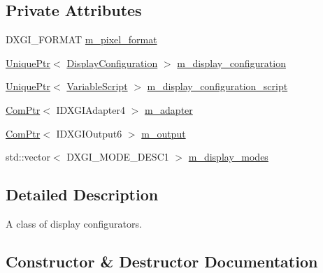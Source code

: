 \subsection*{Private Attributes}
\begin{DoxyCompactItemize}
\item 
D\+X\+G\+I\+\_\+\+F\+O\+R\+M\+AT \hyperlink{classmage_1_1_display_configurator_a22998ef4e54c3da0118a734164792b8f}{m\+\_\+pixel\+\_\+format}
\item 
\hyperlink{namespacemage_a3316d7143a973e37adf1110f2e80ca31}{Unique\+Ptr}$<$ \hyperlink{structmage_1_1_display_configuration}{Display\+Configuration} $>$ \hyperlink{classmage_1_1_display_configurator_a5bccdf0eb57db38cf4e933ecf127488d}{m\+\_\+display\+\_\+configuration}
\item 
\hyperlink{namespacemage_a3316d7143a973e37adf1110f2e80ca31}{Unique\+Ptr}$<$ \hyperlink{classmage_1_1_variable_script}{Variable\+Script} $>$ \hyperlink{classmage_1_1_display_configurator_ab4030a5fe67b8253113799f42a0868c0}{m\+\_\+display\+\_\+configuration\+\_\+script}
\item 
\hyperlink{namespacemage_ae74f374780900893caa5555d1031fd79}{Com\+Ptr}$<$ I\+D\+X\+G\+I\+Adapter4 $>$ \hyperlink{classmage_1_1_display_configurator_a2839c57559a284d6cfbedaaa1a8bcd9f}{m\+\_\+adapter}
\item 
\hyperlink{namespacemage_ae74f374780900893caa5555d1031fd79}{Com\+Ptr}$<$ I\+D\+X\+G\+I\+Output6 $>$ \hyperlink{classmage_1_1_display_configurator_a255fdce7019b54a3a96021248acad680}{m\+\_\+output}
\item 
std\+::vector$<$ D\+X\+G\+I\+\_\+\+M\+O\+D\+E\+\_\+\+D\+E\+S\+C1 $>$ \hyperlink{classmage_1_1_display_configurator_a181938d55d2c57d695c26451054a7c9d}{m\+\_\+display\+\_\+modes}
\end{DoxyCompactItemize}


\subsection{Detailed Description}
A class of display configurators. 

\subsection{Constructor \& Destructor Documentation}
\hypertarget{classmage_1_1_display_configurator_a88fe13ec0a6902fdc1666a2710a16647}{}\label{classmage_1_1_display_configurator_a88fe13ec0a6902fdc1666a2710a16647} 
